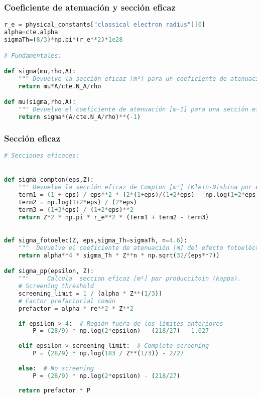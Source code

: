 \subsubsection{Coeficiente de atenuación y sección eficaz}
\begin{lstlisting}[language=python]
r_e = physical_constants["classical electron radius"][0]
alpha=cte.alpha
sigmaTh=(8/3)*np.pi*(r_e**2)*1e28

# Fundamentales: 

def sigma(mu,rho,A): 
    """ Devuelve la sección eficaz [m²] para un coeficiente de atenuación, densidad y número másico"""
    return mu*A/cte.N_A/rho

def mu(sigma,rho,A): 
    """ Devuelve el coeficiente de atenuación [m-1] para una sección eficaz [m²], densidad y número másico"""
    return sigma*(A/cte.N_A/rho)**(-1)
\end{lstlisting}
\subsubsection{Sección eficaz}
\begin{lstlisting}[language=python]
# Secciones eficaces: 


def sigma_compton(eps,Z):
    """ Devuelve la sección eficaz de Compton [m²] (Klein-Nishina por el numero de electrones)"""
    term1 = (1 + eps) / eps**2 * (2*(1+eps)/(1+2*eps) - np.log(1+2*eps)/eps)
    term2 = np.log(1+2*eps) / (2*eps)
    term3 = (1+3*eps) / (1+2*eps)**2
    return Z*2 * np.pi * r_e**2 * (term1 + term2 - term3)
    

def sigma_fotoelec(Z, eps,sigma_Th=sigmaTh, n=4.6):
    """  Devuelve el coeficiente de atenuación [m] del efecto fotoeléctrico. """
    return alpha**4 * sigma_Th * Z**n * np.sqrt(32/(eps**7))

def sigma_pp(epsilon, Z):
    """     Calcula  seccion eficaz [m²] par produccitoin (kappa).     """
    # Screening threshold
    screening_limit = 1 / (alpha * Z**(1/3))
    # Factor prefactorial común
    prefactor = alpha * re**2 * Z**2
    
    if epsilon > 4:  # Región fuera de los límites anteriores
        P = (28/9) * np.log(2*epsilon) - (218/27) - 1.027
    
    elif epsilon > screening_limit:  # Complete screening
        P = (28/9) * np.log(183 / Z**(1/3)) - 2/27
    
    else:  # No screening
        P = (28/9) * np.log(2*epsilon) - (218/27)
    
    return prefactor * P
\end{lstlisting}
